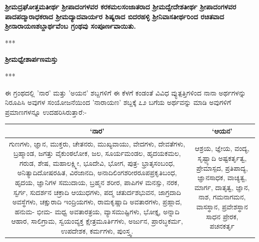 \begin{center}
\textbf{ಶ‍್ರೀಮದ್ರಘೋತ್ತಮತೀರ್ಥ ಶ‍್ರೀಪಾದಂಗಳವರ ಕರಕಮಲಸಂಜಾತರಾದ ಶ‍್ರೀಮದ್ವೇದೇಶತೀರ್ಥ ಶ‍್ರೀಪಾದಂಗಳವರ ಪಾದಪದ್ಮಾರಾಧಕರಾದ ಶ‍್ರೀಮದ್ಯಾದವಾರ್ಯರ ಶಿಷ್ಯರಾದ ಬಿದರಹಳ್ಳಿ ಶ‍್ರೀನಿವಾಸತೀರ್ಥರಿಂದ ರಚಿತವಾದ ಶ‍್ರೀನಾರಾಯಣಶಬ್ದಾರ್ಥವೆಂಬ ಗ್ರಂಥವು ಸಂಪೂರ್ಣವಾಯಿತು.}
\end{center}

\begin{center}
***
\end{center}

\begin{center}
\textbf{ಶ‍್ರೀಮಧ್ವೇಶಾರ್ಪಣಮಸ್ತು}
\end{center}

\begin{center}
***
\end{center}

ಈ ಗ್ರಂಥದಲ್ಲಿ 'ನಾರ' ಮತ್ತು 'ಅಯನ' ಶಬ್ದಗಳಿಗೆ ಈ ಕೆಳಗೆ ಕಂಡಂತೆ ವಿವಿಧ ವ್ಯುತ್ಪತ್ತಿಗಳಿಂದ ನಾನಾ ಅರ್ಥಗಳನ್ನು ನಿರೂಪಿಸಿ ಅವುಗಳ ಸಂಯೋಜನೆಯಿಂದ 'ನಾರಾಯಣ' ಶಬ್ದಕ್ಕೆ ೭೨ ಬಗೆಯ ಅರ್ಥವನ್ನು ಮಾಡಿ ಅವುಗಳಿಗೆ ಪ್ರಮಾಣಗಳನ್ನೂ ಉದಹರಿಸಿರುತ್ತಾರೆ:-

\begin{tabular}{|c|c|}
\hline
\textbf{`ನಾರ'} & `ಆಯನ' \\
\hline
ಗುಣಗಳು, ಜ್ಞಾನ, ಮುಕ್ತರು, ಚೇತನರು, ಮುಖ್ಯವಾಯು, ವೇದಗಳು, ದೇವತೆಗಳು, ಬ್ರಹ್ಮಾಂಡ, ಜಗತ್ತು ವೈಕುಂಠಲೋಕ, ಜಲ, ಸೂರ್ಯಮಂಡಲ, ಹೃದಯಕಮಲ, ಗರುಡ, ಶೇಷ, ಮಹಾಲಕ್ಷ್ಮೀ, ಭೂದೇವಿ, ಭೋಗ, ಪುತ್ರ- ಭ್ರಾತೃಸಂಬಂಧ, ಅನಿತ್ಯಾದಿದೋಷರಹಿತ, ವಿರಜಾನದಿ, ಅನಾದಿಲಿಂಗಶರೀರರೂಪಪ್ರಕೃತಿಬಂಧ, ಹೃದಯ, ಜ್ಞಾನಿಗಳ ಸಮುದಾಯ,  ಬ್ರಹ್ಮನ ಶರೀರ, ಪಾಪಿಗಳ ಮನಸ್ಸು, ನರಕ, ಸ್ವರ್ಗ, ಸುದರ್ಶನ ಚಕ್ರಾದಿ ಆಯುಧಗಳು, ಪದ್ಮ ಚತುರ್ದಶಭುವನ, ಜಾಗ್ರದಾದಿ ಅವಸ್ಥೆಗಳು, ಚಕ್ಷುರಾದಿ ಇಂದ್ರಿಯಗಳು, ರಾಮಕೃಷ್ಣಾದಿ ಅವತಾರಗಳು, ಪ್ರಹ್ಲಾದ, ಹನುಮ- ಭೀಮ- ಮಧ್ವ ಅವತಾರತ್ರಯ, ವ್ಯಾಸಮುಷ್ಟಿಗಳು, ಭೋಕ್ತೃ, ಅನ್ನಾದಿ ಆಹಾರ, ಸಾಲಿಗ್ರಾಮ, ಸ್ವಯಂವ್ಯಕ್ತ ಕ್ಷೇತ್ರಮೂರ್ತಿಗಳು, ಅರ್ಜುನ, ಪ್ರಾರಬ್ಧಕರ್ಮ, ಉಪದೇಶಕ, ಕರ್ಮಗಳು, ಪುಂಸ್ತ್ವ. & ಆಶ್ರಯ, ಜ್ಞೇಯ,  ವಂದ್ಯ, ಸೃಷ್ಟ್ಯಾದಿ ಅಷ್ಟಕರ್ತೃತ್ವ, ಪ್ರೇಮಾಸ್ಪದ,  ಪ್ರತಿಪಾದ್ಯ, ಜ್ಞಾನಸಾಧಕ,  ವಾಚ್ಯತ್ವ, ಮಾರ್ಗ, ದಾತೃತ್ವ, ಜ್ಞಾನ, ನಾಶ,  ಗಮನಾಗಮನ,  ವಾಸಸ್ಥಾನ, ಪ್ರವೇಶಸ್ಥಾನ  ಸಾಧನ ಪ್ರೇರಕ, ಪಚನಕರ್ತೃ \\
\hline
\end{tabular}

